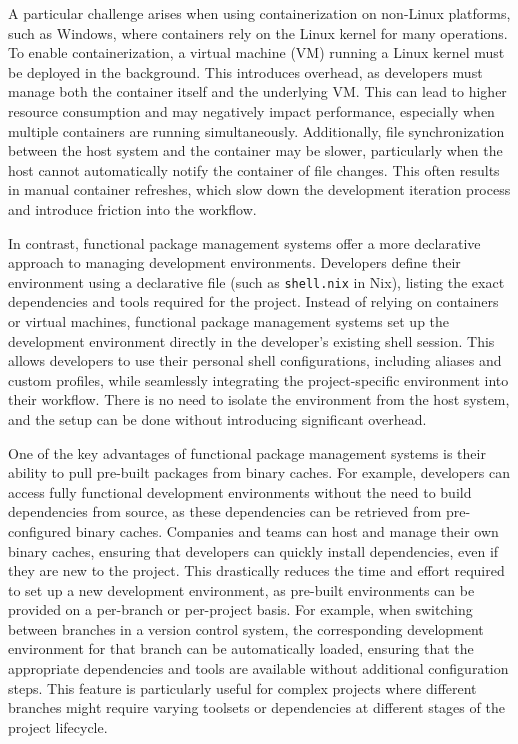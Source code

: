 A particular challenge arises when using containerization on non-Linux platforms, such as
Windows, where containers rely on the Linux kernel for many operations. To enable
containerization, a virtual machine (VM) running a Linux kernel must be deployed in the
background. This introduces overhead, as developers must manage both the container itself
and the underlying VM. This can lead to higher resource consumption and may negatively impact
performance, especially when multiple containers are running simultaneously. Additionally,
file synchronization between the host system and the container may be slower, particularly
when the host cannot automatically notify the container of file changes. This often results
in manual container refreshes, which slow down the development iteration process and introduce
friction into the workflow.

In contrast, functional package management systems offer a more declarative approach to
managing development environments. Developers define their environment using a declarative
file (such as \texttt{shell.nix} in Nix), listing the exact dependencies and tools required
for the project. Instead of relying on containers or virtual machines, functional package
management systems set up the development environment directly in the developer’s existing
shell session. This allows developers to use their personal shell configurations, including
aliases and custom profiles, while seamlessly integrating the project-specific environment
into their workflow. There is no need to isolate the environment from the host system, and
the setup can be done without introducing significant overhead.

One of the key advantages of functional package management systems is their ability to pull
pre-built packages from binary caches. For example, developers can access fully functional
development environments without the need to build dependencies from source, as these
dependencies can be retrieved from pre-configured binary caches. Companies and teams can
host and manage their own binary caches, ensuring that developers can quickly install
dependencies, even if they are new to the project. This drastically reduces the time and
effort required to set up a new development environment, as pre-built environments can be
provided on a per-branch or per-project basis. For example, when switching between branches
in a version control system, the corresponding development environment for that branch can
be automatically loaded, ensuring that the appropriate dependencies and tools are available
without additional configuration steps. This feature is particularly useful for complex
projects where different branches might require varying toolsets or dependencies at different
stages of the project lifecycle.

